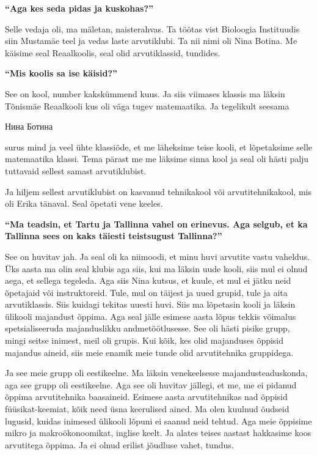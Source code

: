 \textbf{\enquote{Aga kes seda pidas ja kuskohas?}}

Selle vedaja oli, ma mäletan, naisterahvas. Ta töötas vist Bioloogia Instituudis siin Mustamäe teel ja vedas laste  arvutiklubi. Ta nii nimi oli Nina Botina. Me käisime seal Reaalkoolis, seal olid arvutiklassid, tundides.

\textbf{\enquote{Mis koolis sa ise käisid?}}

See on kool, number kakskümmend kuus. Ja siis viimases klassis ma läksin Tõnismäe Reaalkooli kus oli väga tugev matemaatika. Ja tegelikult seesama \begin{russian}Нина Ботина\end{russian}  surus mind ja veel ühte klassiõde, et me läheksime teise kooli, et lõpetaksime selle matemaatika klassi. Tema pärast me me läksime sinna kool ja seal oli hästi palju  tuttavaid sellest samast arvutiklubist.

Ja hiljem sellest arvutiklubist on kasvanud tehnikakool või arvutitehnikakool, mis oli Erika tänaval. Seal õpetati vene keeles. 

\textbf{\enquote{Ma teadsin, et Tartu ja Tallinna vahel on erinevus. Aga selgub, et ka Tallinna sees on kaks täiesti teistsugust Tallinna?}}

See on huvitav jah. Ja seal oli ka niimoodi, et minu huvi  arvutite vastu vaheldus. Üks aasta ma olin seal klubis aga siis, kui ma läksin uude kooli, siis mul ei olnud aega, et  sellega tegeleda. Aga siis Nina kutsus, et kuule, et mul ei jätku neid õpetajaid või instruktoreid. Tule, mul on täijest ja uued grupid, tule ja aita arvutiklassis. Siis kuidagi  tekitas uuesti huvi. Siis ma lõpetasin kooli ja läksin ülikooli majandust õppima. Aga seal jälle  esimese aasta lõpus tekkis võimalus spetsialiseeruda majanduslikku andmetöötlusesse. See oli hästi pisike grupp, mingi seitse inimest, meil oli grupis. Kui kõik, kes olid majanduses õppisid majandus aineid, siis meie enamik meie tunde olid  arvutitehnika gruppidega.

Ja see meie grupp oli eestikeelne. Ma läksin venekeelsesse majandusteaduskonda, aga see grupp oli eestikeelne. Aga
see oli huvitav jällegi, et me, me ei pidanud õppima arvutitehnika baasaineid. Esimese aasta arvutitehnikas nad õppisid füüsikat-keemiat, kõik need üsna keerulised ained. Ma olen kuulnud õudseid lugusid, kuidas inimesed ülikooli lõpuni ei saanud neid tehtud. Aga meie õppisime mikro ja makroökonoomikat, inglise keelt. Ja alates teises aastast hakkasime koos arvutitega õppima. Ja ei olnud erilist jõudluse vahet, tundus.

